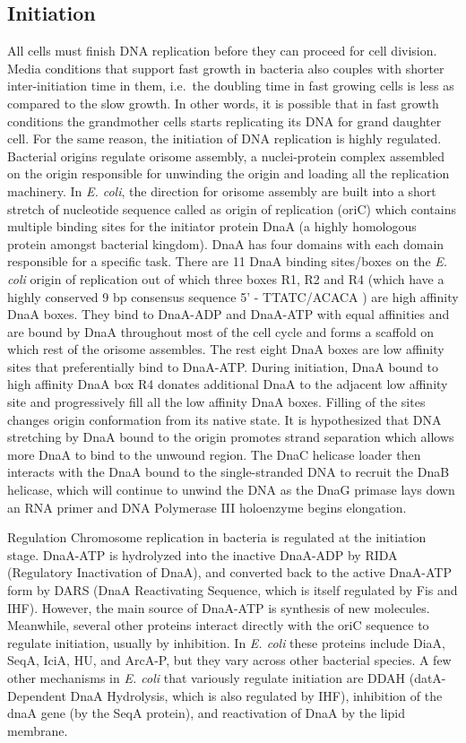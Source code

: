 \hypertarget{initiation-1}{%
\subsection{Initiation}\label{initiation-1}}

All cells must finish DNA replication before they can proceed for cell division. Media conditions that support fast growth in bacteria also couples with shorter inter-initiation time in them, i.e.~the doubling time in fast growing cells is less as compared to the slow growth. In other words, it is possible that in fast growth conditions the grandmother cells starts replicating its DNA for grand daughter cell. For the same reason, the initiation of DNA replication is highly regulated. Bacterial origins regulate orisome assembly, a nuclei-protein complex assembled on the origin responsible for unwinding the origin and loading all the replication machinery. In \emph{E. coli}, the direction for orisome assembly are built into a short stretch of nucleotide sequence called as origin of replication (oriC) which contains multiple binding sites for the initiator protein DnaA (a highly homologous protein amongst bacterial kingdom). DnaA has four domains with each domain responsible for a specific task. There are 11 DnaA binding sites/boxes on the \emph{E. coli} origin of replication out of which three boxes R1, R2 and R4 (which have a highly conserved 9 bp consensus sequence 5' - TTATC/ACACA ) are high affinity DnaA boxes. They bind to DnaA-ADP and DnaA-ATP with equal affinities and are bound by DnaA throughout most of the cell cycle and forms a scaffold on which rest of the orisome assembles. The rest eight DnaA boxes are low affinity sites that preferentially bind to DnaA-ATP. During initiation, DnaA bound to high affinity DnaA box R4 donates additional DnaA to the adjacent low affinity site and progressively fill all the low affinity DnaA boxes. Filling of the sites changes origin conformation from its native state. It is hypothesized that DNA stretching by DnaA bound to the origin promotes strand separation which allows more DnaA to bind to the unwound region. The DnaC helicase loader then interacts with the DnaA bound to the single-stranded DNA to recruit the DnaB helicase, which will continue to unwind the DNA as the DnaG primase lays down an RNA primer and DNA Polymerase III holoenzyme begins elongation.

Regulation
Chromosome replication in bacteria is regulated at the initiation stage. DnaA-ATP is hydrolyzed into the inactive DnaA-ADP by RIDA (Regulatory Inactivation of DnaA), and converted back to the active DnaA-ATP form by DARS (DnaA Reactivating Sequence, which is itself regulated by Fis and IHF). However, the main source of DnaA-ATP is synthesis of new molecules. Meanwhile, several other proteins interact directly with the oriC sequence to regulate initiation, usually by inhibition. In \emph{E. coli} these proteins include DiaA, SeqA, IciA, HU, and ArcA-P, but they vary across other bacterial species. A few other mechanisms in \emph{E. coli} that variously regulate initiation are DDAH (datA-Dependent DnaA Hydrolysis, which is also regulated by IHF), inhibition of the dnaA gene (by the SeqA protein), and reactivation of DnaA by the lipid membrane.

